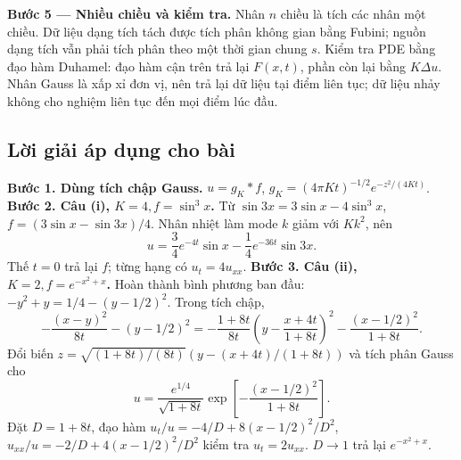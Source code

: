 \documentclass[10pt,a4paper]{article}
\begin{document}
\textbf{Bước 5 — Nhiều chiều và kiểm tra.} Nhân $n$ chiều là tích các nhân một chiều. Dữ liệu dạng tích tách được tích phân không gian bằng Fubini; nguồn dạng tích vẫn phải tích phân theo một thời gian chung $s$. Kiểm tra PDE bằng đạo hàm Duhamel: đạo hàm cận trên trả lại $F(x,t)$, phần còn lại bằng $K\Delta u$. Nhân Gauss là xấp xỉ đơn vị, nên trả lại dữ liệu tại điểm liên tục; dữ liệu nhảy không cho nghiệm liên tục đến mọi điểm lúc đầu.
\subsection*{Lời giải áp dụng cho bài}
\textbf{Bước 1. Dùng tích chập Gauss.} $u=g_K*f$, $g_K=(4\pi Kt)^{-1/2}e^{-z^2/(4Kt)}$.
\textbf{Bước 2. Câu (i), $K=4,f=\sin^3x$.}
Từ $\sin3x=3\sin x-4\sin^3x$, $f=(3\sin x-\sin3x)/4$. Nhân nhiệt làm mode $k$ giảm với $Kk^2$, nên
\[u=\frac34e^{-4t}\sin x-\frac14e^{-36t}\sin3x.\]
Thế $t=0$ trả lại $f$; từng hạng có $u_t=4u_{xx}$.
\textbf{Bước 3. Câu (ii), $K=2,f=e^{-x^2+x}$.}
Hoàn thành bình phương ban đầu: $-y^2+y=1/4-(y-1/2)^2$. Trong tích chập,
\[-\frac{(x-y)^2}{8t}-(y-1/2)^2
=-\frac{1+8t}{8t}\left(y-\frac{x+4t}{1+8t}\right)^2
-\frac{(x-1/2)^2}{1+8t}.\]
Đổi biến $z=\sqrt{(1+8t)/(8t)}(y-(x+4t)/(1+8t))$ và tích phân Gauss cho
\[u=\frac{e^{1/4}}{\sqrt{1+8t}}
\exp\left[-\frac{(x-1/2)^2}{1+8t}\right].\]
Đặt $D=1+8t$, đạo hàm $u_t/u=-4/D+8(x-1/2)^2/D^2$, $u_{xx}/u=-2/D+4(x-1/2)^2/D^2$ kiểm tra $u_t=2u_{xx}$. $D\to1$ trả lại $e^{-x^2+x}$.
\end{document}
